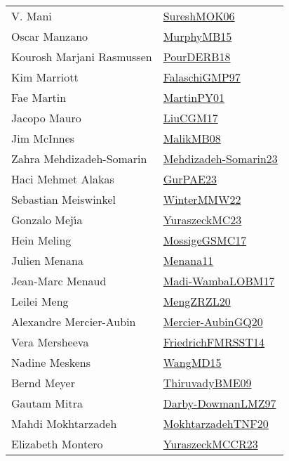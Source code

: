 {\begin{longtable}{p{4cm}p{20cm}}
V. Mani & \href{}{SureshMOK06}\cite{SureshMOK06} \\
Oscar Manzano & \href{papers/MurphyMB15.pdf}{MurphyMB15}\cite{MurphyMB15} \\
Kourosh Marjani Rasmussen & \href{articles/PourDERB18.pdf}{PourDERB18}\cite{PourDERB18} \\
Kim Marriott & \href{articles/FalaschiGMP97.pdf}{FalaschiGMP97}\cite{FalaschiGMP97} \\
Fae Martin & \href{articles/MartinPY01.pdf}{MartinPY01}\cite{MartinPY01} \\
Jacopo Mauro & \href{papers/LiuCGM17.pdf}{LiuCGM17}\cite{LiuCGM17} \\
Jim McInnes & \href{}{MalikMB08}\cite{MalikMB08} \\
Zahra Mehdizadeh{-}Somarin & \href{papers/Mehdizadeh-Somarin23.pdf}{Mehdizadeh-Somarin23}\cite{Mehdizadeh-Somarin23} \\
Haci Mehmet Alakas & \href{articles/GurPAE23.pdf}{GurPAE23}\cite{GurPAE23} \\
Sebastian Meiswinkel & \href{papers/WinterMMW22.pdf}{WinterMMW22}\cite{WinterMMW22} \\
Gonzalo Mej{\'{\i}}a & \href{papers/YuraszeckMC23.pdf}{YuraszeckMC23}\cite{YuraszeckMC23} \\
Hein Meling & \href{papers/MossigeGSMC17.pdf}{MossigeGSMC17}\cite{MossigeGSMC17} \\
Julien Menana & \href{}{Menana11}\cite{Menana11} \\
Jean{-}Marc Menaud & \href{papers/Madi-WambaLOBM17.pdf}{Madi-WambaLOBM17}\cite{Madi-WambaLOBM17} \\
Leilei Meng & \href{articles/MengZRZL20.pdf}{MengZRZL20}\cite{MengZRZL20} \\
Alexandre Mercier{-}Aubin & \href{papers/Mercier-AubinGQ20.pdf}{Mercier-AubinGQ20}\cite{Mercier-AubinGQ20} \\
Vera Mersheeva & \href{}{FriedrichFMRSST14}\cite{FriedrichFMRSST14} \\
Nadine Meskens & \href{articles/WangMD15.pdf}{WangMD15}\cite{WangMD15} \\
Bernd Meyer & \href{papers/ThiruvadyBME09.pdf}{ThiruvadyBME09}\cite{ThiruvadyBME09} \\
Gautam Mitra & \href{articles/Darby-DowmanLMZ97.pdf}{Darby-DowmanLMZ97}\cite{Darby-DowmanLMZ97} \\
Mahdi Mokhtarzadeh & \href{}{MokhtarzadehTNF20}\cite{MokhtarzadehTNF20} \\
Elizabeth Montero & \href{articles/YuraszeckMCCR23.pdf}{YuraszeckMCCR23}\cite{YuraszeckMCCR23} \\

\end{longtable}}
